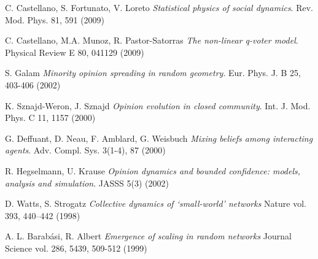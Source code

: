 \documentclass{article}
\begin{document}
\begin{thebibliography}{90}
C. Castellano, S. Fortunato, V. Loreto
  \emph{Statistical physics of social dynamics}.  
Rev. Mod. Phys. 81, 591 (2009)

C. Castellano, M.A. Munoz, R. Pastor-Satorras
  \emph{The non-linear q-voter model}.  
Physical Review E 80, 041129 (2009)

S. Galam
	\emph{Minority opinion spreading in random geometry}.
Eur. Phys. J. B 25, 403-406 (2002)

K. Sznajd-Weron, J. Sznajd
	\emph{Opinion evolution in closed community}. Int. J. Mod. Phys. C 11, 1157 (2000)
	
G. Deffuant, D. Neau, F. Amblard, G. Weisbuch
	\emph{Mixing beliefs among interacting agents}. Adv. Compl. Sys. 3(1-4), 87 (2000)
	
R. Hegselmann, U. Krause
	\emph{Opinion dynamics and bounded confidence: models, analysis and simulation}. JASSS 5(3) (2002)

D. Watts, S. Strogatz
	\emph{Collective dynamics of ‘small-world’ networks}
Nature vol. 393, 440–442 (1998)

A. L. Barabási, R. Albert
	\emph{Emergence of scaling in random networks}
Journal Science vol. 286, 5439, 509-512 (1999)



\end{thebibliography}
\end{document}
